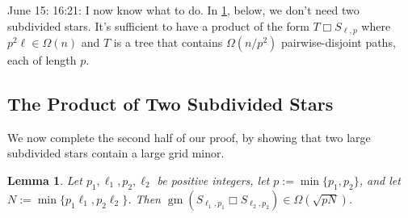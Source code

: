 \documentclass[12pt]{article}
\newcommand{\boxprod}{\mathbin{\Box}}
\DeclareMathOperator{\gm}{gm}
\theoremstyle{plain}
\newtheorem{lem}[thm]{Lemma}
\theoremstyle{definition}
\begin{document}
June 15: 16:21:  I now know what to do.  In \cref{star_times_star}, below, we don't need two subdivided stars.  It's sufficient to have a product of the form $T\boxprod S_{\ell,p}$ where $p^2\ell\in\Omega(n)$ and $T$ is a tree that contains $\Omega(n/p^2)$ pairwise-disjoint paths, each of length $p$.  

\subsection{The Product of Two Subdivided Stars}

We now complete the second half of our proof, by showing that two large subdivided stars contain a large grid minor.

\begin{lem}\label{star_times_star}
  Let $p_1,\ell_1,p_2,\ell_2$ be positive integers, let $p:=\min\{p_1,p_2\}$, and let $N:=\min\{p_1\ell_1,p_2\ell_2\}$.  Then $\gm(S_{\ell_1,p_1}\boxprod S_{\ell_2,p_2})\in \Omega(\sqrt{pN})$. 
\end{lem}
\end{document}
